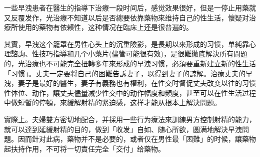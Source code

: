 \documentclass[12pt,UTF8]{ctexbook}
\begin{document}
一些早洩患者在醫生的指導下治療一段时间后，感觉效果很好，但是一停止用藥就又反覆发作，光治療不知道以后是否總要依靠藥物來维持自己的性生活，懷疑对治療所使用的藥物有依賴性，这种情况在臨床上还是很普遍的。

其實，早洩这个籠罩在男性心头上的沉重險影，是長期以來形成的习惯，单純靠心理諮詢、性技巧指導和几个小藥片(儘管可能很有效)，是很難徹底解決所有問題的，光治療也不可能完全扭轉多年來形成的早洩习惯，必須要重新建立新的性生活「习惯」。丈夫一定要将自己的困難告訴妻子，以得到妻子的諒解。治療丈夫的早洩，妻子是最好的醫生，妻子有義務也有權利，在性交时督促丈夫改变以往的习惯性体位、动作，讓丈夫儘量减少性交中的动作幅度和頻度，甚至可以在性生活过程中做短暫的停頓，來緩解射精的紧迫感，这样才能从根本上解決問題。

實際上。夫婦雙方密切地配合，并採用一些行为療法來訓練男方控制射精的能力，就可以達到延緩射精的目的，做到「收发」自如、随心所欲，圆满地解決早洩問題。因而針对此病，藥物并不是必要的，或者仅在男性最「困難」的时候，讓藥物起扶持作用，不可将一切責任完全「交付」给藥物。

\backmatter
\end{document}

